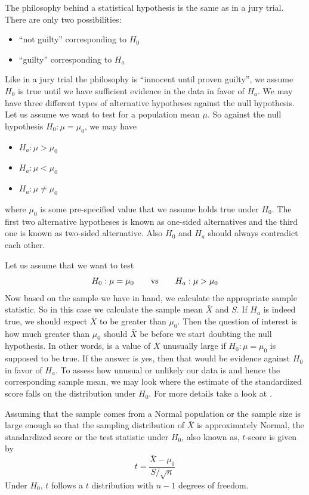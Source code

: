 \documentclass[12]{report}
\begin{document}
The philosophy behind a statistical hypothesis is the same as in a jury trial. There are only two possibilities:
\begin{itemize}
\item ``not guilty'' corresponding to $H_0$
\item ``guilty'' corresponding to $H_a$ 
\end{itemize}
Like in a jury trial the philosophy is ``innocent until proven guilty'', we assume $H_0$ is true until we have sufficient evidence in the data in favor of $H_a$. 
We may have three different types of alternative hypotheses against the null hypothesis. Let us assume we want to test for a population mean $\mu$. So against the null hypothesis $H_0: \mu = \mu_0$, we may have
\begin{itemize}
\item $H_a: \mu > \mu_0$
\item $H_a: \mu < \mu_0$ 
\item $H_a: \mu \ne \mu_0$
\end{itemize}
where $\mu_0$ is some pre-specified value that we assume holds true under $H_0$. The first two alternative hypotheses is known as one-sided alternatives and the third one is known as two-sided alternative. Also $H_0$ and $H_a$ should always contradict each other.

Let us assume that we want to test $$H_0: \mu = \mu_0 \qquad \hbox{vs} \qquad H_a: \mu > \mu_0$$
Now based on the sample we have in hand, we calculate the appropriate sample statistic. So in this case we calculate the sample mean $\bar{X}$ and $S$. If $H_a$ is indeed true, we should expect $\bar{X}$ to be greater than $\mu_0$. Then the question of interest is how much greater than $\mu_0$ should $\bar{X}$ be before we start doubting the null hypothesis. In other words, is a value of $\bar{X}$ unusually large if $H_0: \mu = \mu_0$ is supposed to be true. If the answer is yes, then that would be evidence against $H_0$ in favor of $H_a$. To assess how unusual or unlikely our data is and hence the corresponding sample mean, we may look where the estimate of the standardized score falls on the distribution under $H_0$.  For more details take a look at \cite{kutner:2005}.

Assuming that the sample comes from a Normal population or the sample size is large enough so that the sampling distribution of $\bar{X}$ is approximately Normal, the standardized score or the test statistic under $H_0$, also known as, $t$-score is given by
$$t = \frac{\bar{X} - \mu_0}{S/\sqrt{n}}$$
Under $H_0$, $t$ follows a $t$ distribution with $n - 1$ degrees of freedom.
\end{document}
